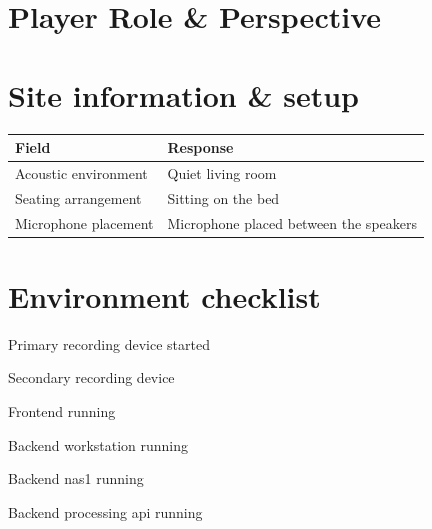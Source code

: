 
\section{Player Role \& Perspective}

\section{Site information \& setup}
\begin{table}[h]
\centering
\begin{tabular}{|p{5cm}|p{10cm}|}
\hline
\textbf{Field} & \textbf{Response} \\ \hline
Acoustic environment & Quiet living room\\[1.5cm] \hline
Seating arrangement & Sitting on the bed\\[1.5cm] \hline
Microphone placement & Microphone placed between the speakers\\[1.5cm] \hline
\end{tabular}
\end{table}

\section{Environment checklist}
    \begin{todolist}
    \item[\done] Primary recording device started
    \item[\done] Secondary recording device
    \item[\done] Frontend running
    \item[\done] Backend workstation running
    \item[\done] Backend nas1 running
    \item[\done] Backend processing api running
    \end{todolist}

